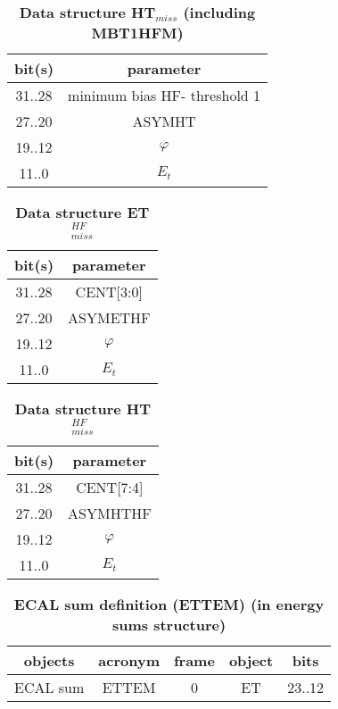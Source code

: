 \documentclass{cmspaper}
\begin{document}
\begin{table}[ht]
\caption{\bf Data structure HT$_{miss}$ \rm(including MBT1HFM)}
\vspace{5mm}
\centering
\begin{tabular}{|c|c|}\hline
bit(s) & parameter \\\hline\hline
31..28 & minimum bias HF- threshold 1 \\
27..20 & ASYMHT \\
19..12 & $\varphi$ \\
11..0 & $E_t$ \\\hline
\end{tabular}
\label{table:htm_object}
\end{table}

\begin{table}[ht]
\caption{\bf Data structure ET$_{miss}^{HF}$}
\vspace{5mm}
\centering
\begin{tabular}{|c|c|}\hline
bit(s) & parameter \\\hline\hline
31..28 & CENT[3:0] \\
27..20 & ASYMETHF \\
19..12 & $\varphi$ \\
11..0 & $E_t$ \\\hline
\end{tabular}
\label{table:etmhf_object}
\end{table}

\begin{table}[ht]
\caption{\bf Data structure HT$_{miss}^{HF}$}
\vspace{5mm}
\centering
\begin{tabular}{|c|c|}\hline
bit(s) & parameter \\\hline\hline
31..28 & CENT[7:4] \\
27..20 & ASYMHTHF \\
19..12 & $\varphi$ \\
11..0 & $E_t$ \\\hline
\end{tabular}
\label{table:htmhf_object}
\end{table}

\begin{table}[ht]
\caption{\bf ECAL sum definition (ETTEM) \rm(in energy sums structure)}
\vspace{5mm}
\centering
\begin{tabular}{|c|c|c|c|c|}\hline
objects & acronym & frame & object & bits \\\hline\hline
ECAL sum & ETTEM & 0 & ET & 23..12 \\\hline
\end{tabular}
\label{table:ettem_def}
\end{table}
\end{document}
